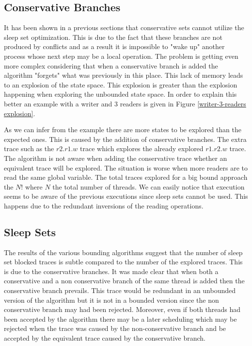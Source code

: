 \subsection{Conservative Branches}
It has been shown in a previous sections that conservative sets cannot utilize the sleep set optimization. This is due
to the fact that these branches are not produced by conflicts and as a result it is impossible to "wake up" another
process whose next step may be a local operation. The problem is getting even more complex considering that when a
conservative branch is added the algorithm "forgets" what was previously in this place. This lack of memory leads to an
explosion of the state space. This explosion is greater than the explosion happening when exploring the unbounded state
space. In order to explain this better an example with a writer and 3 readers is given in Figure \ref{writer-3-readers
explosion}.


As we can infer from the example there are more states to be explored than the expected ones. This is caused by the
addition of conservative branches. The extra trace such as the $r2.r1.w$ trace which explores the already explored $r1.r2.w$
trace. The algorithm is not aware when adding the conservative trace whether an equivalent trace will be explored. The
situation is worse when more readers are to read the same global variable. The total traces explored for a big bound
approach the $N!$ where $N$ the total number of threads. We can easily notice that execution seems to be aware of the
previous executions since sleep sets cannot be used. This happens due to the redundant inversions of the reading
operations. 

\subsection{Sleep Sets}
The results of the various bounding algorithms suggest that the number of sleep set blocked traces is subtle compared to
the number of the explored traces. This is due to the conservative branches. It was made clear that when both a
conservative and a non conservative branch of the same thread is added then the conservative branch prevails. This trace
would be redundant in an unbounded version of the algorithm but it is not in a bounded version since the non
conservative branch may had been rejected. Moreover, even if both threads had been accepted by the algorithm there may
be a later scheduling which may be rejected when the trace was caused by the non-conservative branch and be accepted by
the equivalent trace caused by the conservative branch. 

